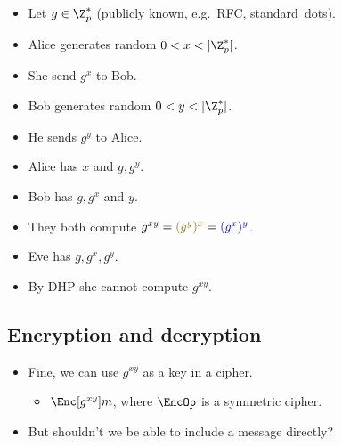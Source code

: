 \begin{frame}
  \begin{definition}
    \begin{itemize}
      \item Let \(g\in \Z_p^*\) (publicly known, e.g.\ RFC, standard\ dots).

        \pause{}

      \color{green!50!red}
      \item Alice generates random \(0 < x < |\Z_p^*|\).
      \item She send \(g^x\) to Bob.

        \pause{}

      \color{blue}
      \item Bob generates random \(0 < y < |\Z_p^*|\).
      \item He sends \(g^y\) to Alice.

        \pause{}

      \color{green!50!red}
      \item Alice has \(x\) and \(g, g^y\).
      \color{blue}
      \item Bob has \(g, g^x\) and \(y\).
      \color{black}
      \item They both compute \(g^{xy} = {\color{green!50!red} (g^y)^x} 
          = {\color{blue} (g^x)^y}\).

        \pause{}

      \color{red}
      \item Eve has \(g, g^x, g^y\).
      \item By \ac{DHP} she cannot compute \(g^{xy}\).
    \end{itemize}
  \end{definition}
\end{frame}

\subsection{Encryption and decryption}

\begin{frame}
  \begin{idea}
    \begin{itemize}
      \item Fine, we can use \(g^{xy}\) as a key in a cipher.
        \begin{itemize}
          \item \(\Enc[g^{xy}]{m}\), where \(\EncOp\) is a symmetric cipher.
        \end{itemize}
      \item But shouldn't we be able to include a message directly?
    \end{itemize}
  \end{idea}
\end{frame}

